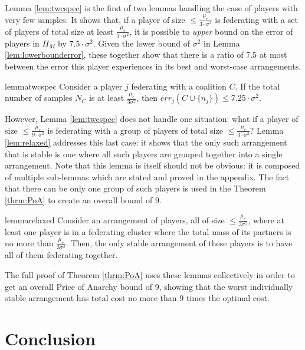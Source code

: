 \documentclass{article}
\newcommand{\cd}[0]{\cdot}
\newcommand{\mue}[0]{\ensuremath{\mu_e}}
\newcommand{\var}[0]{\ensuremath{\sigma^2}}
\newcommand{\ndraw}[0]{\ensuremath{n}}
\newcommand{\total}[0]{\ensuremath{N}}
\newcommand{\col}[0]{\ensuremath{C}}
\newcommand{\partition}[0]{\ensuremath{\Pi}}
\begin{document}
Lemma \ref{lem:twcspec} is the first of two lemmas handling the case of players with very few samples. It shows that, if a player of size $\leq \frac{\mue}{3\cd \var}$ is federating with a set of players of total size at least $\frac{\mue}{3\cd \var}$, it is possible to \emph{upper} bound on the error of players in $\partition_M$ by $7.5\cd \var$. Given the lower bound of $\var$ in Lemma \ref{lem:lowerbounderror}, these together show that there is a ratio of 7.5 at most between the error this player experiences in its best and worst-case arrangements. 

\begin{restatable}{lemma}{twcspec}
\label{lem:twcspec}
Consider a player $j$ federating with a coalition $\col$. If the total number of samples $\total_{\col}$ is at least $\frac{\mue}{3\var}$, then $err_j(\col \cup \{\ndraw_j\}) \leq 7.25 \cd \var$. 
\end{restatable}

However, Lemma \ref{lem:twcspec} does not handle one situation: what if a player of size $\leq \frac{\mue}{9\cd \var}$ is federating with a group of players of total size $\leq \frac{\mue}{3\cd \var}$? Lemma \ref{lem:relaxed} addresses this last case: it shows that the only such arrangement that is stable is one where all such players are grouped together into a single arrangement. Note that this lemma is itself should not be obvious: it is composed of multiple sub-lemmas which are stated and proved in the appendix. The fact that there can be only one group of such players is used in the Theorem \ref{thrm:PoA} to create an overall bound of $9$. 
\begin{restatable}{lemma}{relaxed}
\label{lem:relaxed}
Consider an arrangement of players, all of size $\leq \frac{\mue}{3\var}$, where at least one player is in a federating cluster where the total mass of its partners is no more than $\frac{\mue}{3\var}$. Then, the only stable arrangement of these players is to have all of them federating together. 
\end{restatable}

The full proof of Theorem \ref{thrm:PoA} uses these lemmas collectively in order to get an overall Price of Anarchy bound of 9, showing that the worst individually stable arrangement has total cost no more than 9 times the optimal cost. 

\section{Conclusion}
\end{document}
